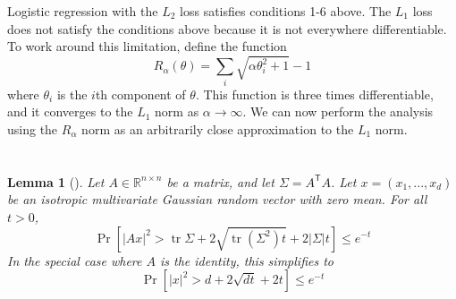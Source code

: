 \documentclass{article}
\newtheorem{lemma}{Lemma}
\theoremstyle{definition}
\DeclareMathOperator*{\tr}{tr}
\DeclareMathOperator*{\probop}{Pr}
\newcommand{\prob}[1]{\ensuremath{\probop\left[{#1}\right]}}
\newcommand{\trans}[1]{\ensuremath{{#1}^{\mathsf{T}}}}
\begin{document}
Logistic regression with the $L_2$ loss satisfies conditions 1-6 above.
The $L_1$ loss does not satisfy the conditions above because it is not everywhere differentiable.
To work around this limitation, define the function
\begin{equation}
R_\alpha(\theta) = \sum_i\sqrt{\alpha \theta_i^2 + 1}-1
\end{equation}
where $\theta_i$ is the $i$th component of $\theta$.
This function is three times differentiable,
and it converges to the $L_1$ norm as $\alpha\to\infty$.
We can now perform the analysis using the $R_\alpha$ norm as an arbitrarily close approximation to the $L_1$ norm.

\section{}
\begin{lemma}[\cite{hsu2012tail}]
\label{lemma:hsu}
Let $A \in \mathbb{R}^{n\times n}$ be a matrix,
and let $\Sigma = \trans A A$.
Let $x=(x_1,...,x_d)$ be an isotropic multivariate Gaussian random vector with zero mean.
For all $t>0$,
\begin{equation}
\prob{|Ax|^2 > \tr{\Sigma} + 2\sqrt{\tr (\Sigma^2)t} + 2|\Sigma|t} \le e^{-t}
\end{equation}
In the special case where $A$ is the identity, this simplifies to
\begin{equation}
\label{eq:stdnormaltail}
\prob{|x|^2 > d + 2\sqrt{dt} + 2t} \le e^{-t}
\end{equation}
\end{lemma}
\end{document}
